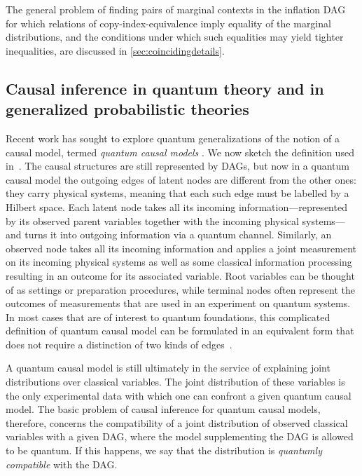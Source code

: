 \documentclass[aps,english,superscriptaddress,onecolumn,twoside,longbibliography,pra,floatfix,fleqn,nofootinbib]{revtex4-1}%
\theoremstyle{definition}
\begin{document}
The general problem of finding pairs of marginal contexts in the inflation DAG for which relations of copy-index-equivalence imply equality of the marginal distributions, and the conditions under which such equalities may yield tighter inequalities, are discussed in \cref{sec:coincidingdetails}.


\subsection{Causal inference in quantum theory and in generalized probabilistic theories}
\label{sec:classicallity}

Recent work has sought to explore quantum generalizations of the notion of a causal model, termed {\em quantum causal models} \cite{leifer2013conditionalstates,pusey2014gdag,BeyondBellII,Chaves2015infoquantum,ried2015quantum}. We now sketch the definition used in~\cite{pusey2014gdag}.
The causal structures are still represented by DAGs, but now in a quantum causal model the outgoing edges of latent nodes are different from the other ones: they carry physical systems, meaning that each such edge must be labelled by a Hilbert space. Each latent node takes all its incoming information---represented by its observed parent variables together with the incoming physical systems---and turns it into outgoing information via a quantum channel. Similarly, an observed node takes all its incoming information and applies a joint measurement on its incoming physical systems as well as some classical information processing resulting in an outcome for its associated variable. Root variables can be thought of as settings or preparation procedures, while terminal nodes often represent the outcomes of measurements that are used in an experiment on quantum systems. In most cases that are of interest to quantum foundations, this complicated definition of quantum causal model can be formulated in an equivalent form that does not require a distinction of two kinds of edges~\cite{BeyondBellII}.

A quantum causal model is still ultimately in the service of explaining joint distributions over classical variables. The joint distribution of these variables is the only experimental data with which one can confront a given quantum causal model. The basic problem of causal inference for quantum causal models, therefore, concerns the compatibility of a joint distribution of observed classical variables with a given DAG, where the model supplementing the DAG is allowed to be quantum. If this happens, we say that the distribution is {\em quantumly compatible} with the DAG.  
 
\end{document}
